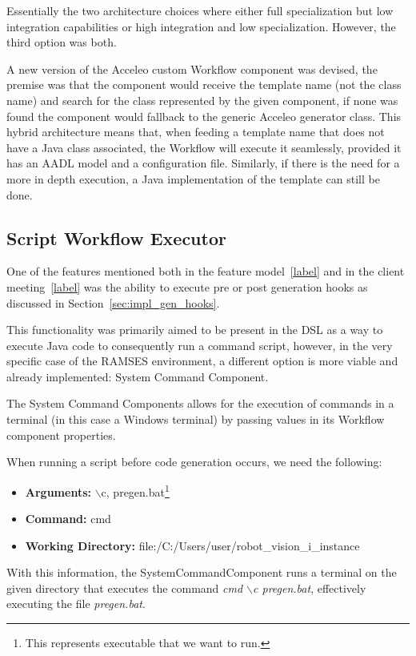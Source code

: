 Essentially the two architecture choices where either full specialization but low integration capabilities or high integration and low specialization. However, the third option was both.

A new version of the Acceleo custom Workflow component was devised, the premise was that the component would receive the template name (not the class name) and search for the class represented by the given component, if none was found the component would fallback to the generic Acceleo generator class. This hybrid architecture means that, when feeding a template name that does not have a Java class associated, the Workflow will execute it seamlessly, provided it has an \gls{AADL} model and a configuration file. Similarly, if there is the need for a more in depth execution, a Java implementation of the template can still be done.


\subsection{Script Workflow Executor}
\label{sec:workflows_script_executor}

One of the features mentioned both in the feature model~\ref{label} and in the client meeting~\ref{label} was the ability to execute pre or post generation hooks as discussed in Section~\ref{sec:impl_gen_hooks}. 

This functionality was primarily aimed to be present in the \gls{DSL} as a way to execute Java code to consequently run a command script, however, in the very specific case of the \gls{RAMSES} environment, a different option is more viable and already implemented: System Command Component.

The System Command Components allows for the execution of commands in a terminal (in this case a Windows terminal) by passing values in its Workflow component properties.

When running a script before code generation occurs, we need the following:

\begin{itemize} 
	\item \textbf{Arguments: } $\backslash$c, pregen.bat\footnote{This represents executable that we want to run.}
	\item \textbf{Command: } cmd
	\item \textbf{Working Directory: } file:/C:/Users/user/robot\_vision\_i\_instance
\end{itemize}

With this information, the SystemCommandComponent runs a terminal on the given directory that executes the command \textit{cmd $\backslash$c pregen.bat}, effectively executing the file \textit{pregen.bat}.


